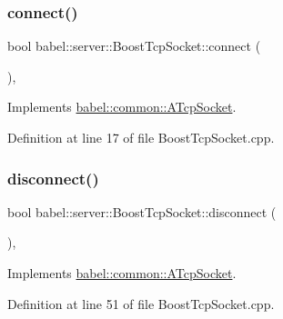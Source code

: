 \subsubsection{\texorpdfstring{connect()}{connect()}}
{\footnotesize\ttfamily bool babel\+::server\+::\+Boost\+Tcp\+Socket\+::connect (\begin{DoxyParamCaption}{ }\end{DoxyParamCaption})\hspace{0.3cm}{\ttfamily [override]}, {\ttfamily [virtual]}}



Implements \mbox{\hyperlink{classbabel_1_1common_1_1_a_tcp_socket_ae049c9a079ad9e4f0ddfc4b2282e2493}{babel\+::common\+::\+A\+Tcp\+Socket}}.



Definition at line 17 of file Boost\+Tcp\+Socket.\+cpp.

\mbox{\label{classbabel_1_1server_1_1_boost_tcp_socket_ab5f0e6ea149aa5c1b54189b2214bac88}} 
\subsubsection{\texorpdfstring{disconnect()}{disconnect()}}
{\footnotesize\ttfamily bool babel\+::server\+::\+Boost\+Tcp\+Socket\+::disconnect (\begin{DoxyParamCaption}{ }\end{DoxyParamCaption})\hspace{0.3cm}{\ttfamily [override]}, {\ttfamily [virtual]}}



Implements \mbox{\hyperlink{classbabel_1_1common_1_1_a_tcp_socket_a8aa4d31dccc7314d5866410846d83159}{babel\+::common\+::\+A\+Tcp\+Socket}}.



Definition at line 51 of file Boost\+Tcp\+Socket.\+cpp.

\mbox{\label{classbabel_1_1server_1_1_boost_tcp_socket_ab02065f9b93488e1ff4aa141ff73ddc1}} 
